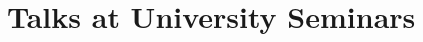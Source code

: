 \documentclass[10pt,a4paper,sans]{moderncv}        %
\begin{document}
%
%
%


\vspace{0.3cm}

\section{Talks at University Seminars}

\vspace{0.3cm}
\end{document}
